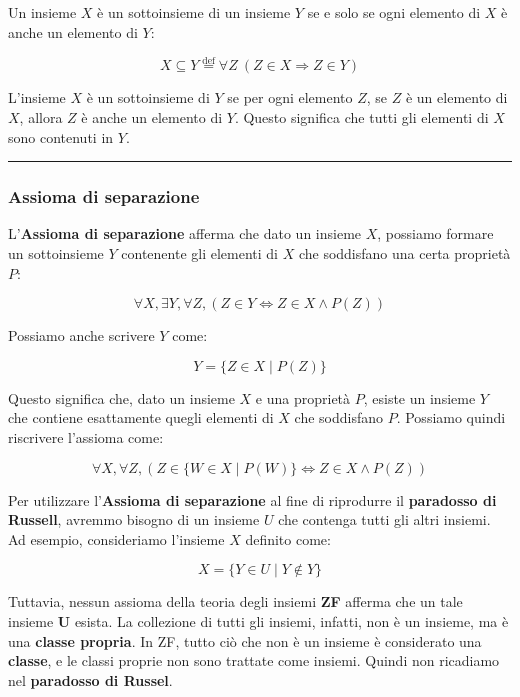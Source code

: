 \documentclass[
  a4paper,
]{article}
\begin{document}
Un insieme \(X\) è un sottoinsieme di un insieme \(Y\) se e solo se ogni
elemento di \(X\) è anche un elemento di \(Y\):

\[
X \subseteq Y \overset{\mathrm{def}}{=} \forall Z \ (Z \in X \Rightarrow Z \in Y)
\]

L'insieme \(X\) è un sottoinsieme di \(Y\) se per ogni elemento \(Z\),
se \(Z\) è un elemento di \(X\), allora \(Z\) è anche un elemento di
\(Y\). Questo significa che tutti gli elementi di \(X\) sono contenuti
in \(Y\).

\par\noindent\rule{\linewidth}{0.4pt}\par\vspace{6pt}

\hypertarget{assioma-di-separazione}{%
\subsubsection{Assioma di separazione}\label{assioma-di-separazione}}

L'\textbf{Assioma di separazione} afferma che dato un insieme \(X\),
possiamo formare un sottoinsieme \(Y\) contenente gli elementi di \(X\)
che soddisfano una certa proprietà \(P\):

\[
\forall X, \exists Y, \forall Z, (Z \in Y \iff Z \in X \land P(Z))
\]

Possiamo anche scrivere \(Y\) come:

\[
Y = \{ Z \in X \mid P(Z) \}
\]

Questo significa che, dato un insieme \(X\) e una proprietà \(P\),
esiste un insieme \(Y\) che contiene esattamente quegli elementi di
\(X\) che soddisfano \(P\). Possiamo quindi riscrivere l'assioma come:

\[
\forall X, \forall Z, (Z \in \{W \in X\mid P(W) \} \iff Z \in X \land P(Z))
\]

Per utilizzare l'\textbf{Assioma di separazione} al fine di riprodurre
il \textbf{paradosso di Russell}, avremmo bisogno di un insieme \(U\)
che contenga tutti gli altri insiemi. Ad esempio, consideriamo l'insieme
\(X\) definito come:

\[
X = \{ Y \in U \mid Y \notin Y \}
\]

Tuttavia, nessun assioma della teoria degli insiemi \textbf{ZF} afferma
che un tale insieme \textbf{U} esista. La collezione di tutti gli
insiemi, infatti, non è un insieme, ma è una \textbf{classe propria}. In
ZF, tutto ciò che non è un insieme è considerato una \textbf{classe}, e
le classi proprie non sono trattate come insiemi. Quindi non ricadiamo
nel \textbf{paradosso di Russel}.
\end{document}
